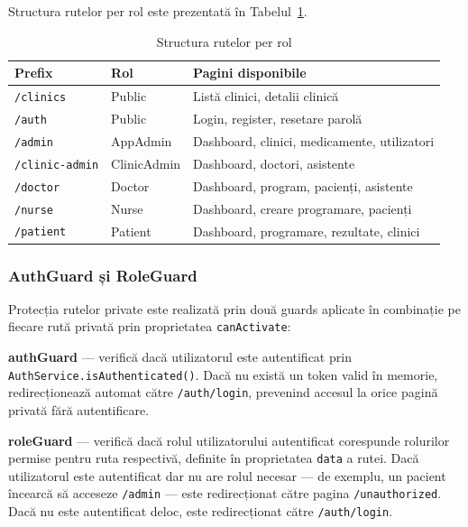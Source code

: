 \documentclass[12pt, a4paper]{report}
\begin{document}
Structura rutelor per rol este prezentată în
Tabelul~\ref{tab:routes}.

\begin{table}[H]
\centering
\caption{Structura rutelor per rol}
\label{tab:routes}
\begin{tabular}{|l|l|l|}
\hline
\textbf{Prefix} & \textbf{Rol} & \textbf{Pagini disponibile} \\
\hline
\texttt{/clinics}      & Public     & Listă clinici, detalii clinică \\
\texttt{/auth}         & Public     & Login, register, resetare parolă \\
\texttt{/admin}        & AppAdmin   & Dashboard, clinici, medicamente, utilizatori \\
\texttt{/clinic-admin} & ClinicAdmin & Dashboard, doctori, asistente \\
\texttt{/doctor}       & Doctor     & Dashboard, program, pacienți, asistente \\
\texttt{/nurse}        & Nurse      & Dashboard, creare programare, pacienți \\
\texttt{/patient}      & Patient    & Dashboard, programare, rezultate, clinici \\
\hline
\end{tabular}
\end{table}

\subsubsection{AuthGuard și RoleGuard}

Protecția rutelor private este realizată prin două guards aplicate în combinație
pe fiecare rută privată prin proprietatea \texttt{canActivate}:

\textbf{authGuard} --- verifică dacă utilizatorul este autentificat prin
\texttt{AuthService.isAuthenticated()}. Dacă nu există un token valid în memorie,
redirecționează automat către \texttt{/auth/login}, prevenind accesul la orice
pagină privată fără autentificare.

\textbf{roleGuard} --- verifică dacă rolul utilizatorului autentificat corespunde
rolurilor permise pentru ruta respectivă, definite în proprietatea \texttt{data}
a rutei. Dacă utilizatorul este autentificat dar nu are rolul necesar --- de exemplu,
un pacient încearcă să acceseze \texttt{/admin} --- este redirecționat către pagina
\texttt{/unauthorized}. Dacă nu este autentificat deloc, este redirecționat către
\texttt{/auth/login}.
\end{document}

